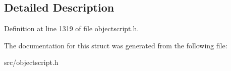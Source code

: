 \subsection{Detailed Description}


Definition at line 1319 of file objectscript.\+h.



The documentation for this struct was generated from the following file\+:\begin{DoxyCompactItemize}
\item 
src/objectscript.\+h\end{DoxyCompactItemize}
